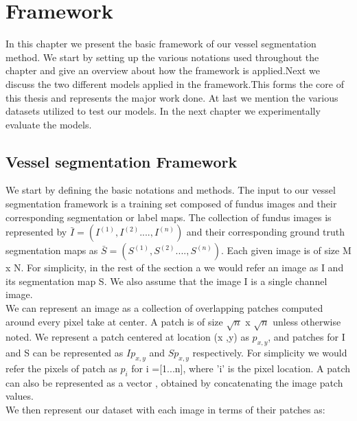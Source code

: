 \chapter{Framework}

\ifpdf
\graphicspath{{Chapter3/Figs/Raster/}{Chapter3/Figs/PDF/}{Chapter3/Figs/}}
\else
\graphicspath{{Chapter3/Figs/Vector/}{Chapter3/Figs/}}
\fi
In this chapter we present the basic framework of our vessel segmentation method. We start by setting up the various notations used throughout the chapter and give an overview about how the framework is applied.Next we discuss the two different models applied in the framework.This forms the core of this thesis and represents the major work done. At last we mention the various datasets utilized to test our models. In the next chapter we experimentally evaluate the models.\\
\section{Vessel segmentation Framework}
We start by defining the basic notations and methods. The input to our vessel segmentation framework is a training set composed of fundus images and their corresponding segmentation or label maps. The collection of fundus images is represented by $\bar{I} = (I^{(1)},I^{(2)}...., I^{(n)} )$  and their corresponding ground truth segmentation maps as $\bar{S} = (S^{(1)},S^{(2)}...., S^{(n)} )$. Each given image is of size M x N.
For simplicity, in the rest of the section a we would refer an image as I and its segmentation map S. We also assume that the image I is a single channel image.\\

We can represent an image as a collection of overlapping patches computed around every pixel take at center. A patch is of size $\sqrt{n}$ x $\sqrt{n}$ unless otherwise noted. We represent a patch centered at location (x ,y) as $p_{x,y}$, and patches for I and S can be represented as $Ip_{x,y}$ and $Sp_{x,y}$ respectively. For simplicity we would refer the pixels of patch as ${p}_i$ for i =[1...n], where 'i' is the pixel location. A patch can also be represented as a vector , obtained by concatenating the image patch values.\\

We then represent our dataset with each image in terms of their patches as:

